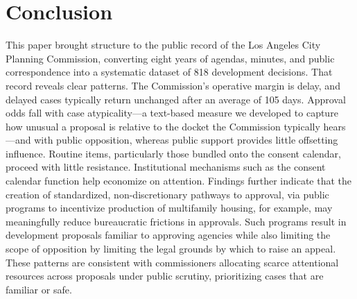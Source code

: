 \section{Conclusion}\label{sec_conclusion}


This paper brought structure to the public record of the Los Angeles City Planning Commission, converting eight years of agendas, minutes, and public correspondence into a systematic dataset of 818 development decisions. That record reveals clear patterns. The Commission's operative margin is delay, and delayed cases typically return unchanged after an average of 105 days. Approval odds fall with case atypicality---a text-based measure we developed to capture how unusual a proposal is relative to the docket the Commission typically hears---and with public opposition, whereas public support provides little offsetting influence. Routine items, particularly those bundled onto the consent calendar, proceed with little resistance. Institutional mechanisms such as the consent calendar function help economize on attention. Findings further indicate that the creation of standardized, non-discretionary pathways to approval, via public programs to incentivize production of multifamily housing, for example, may meaningfully reduce bureaucratic frictions in approvals.  Such programs result in development proposals familiar to approving agencies while also limiting the scope of opposition by limiting the legal grounds by which to raise an appeal. These patterns are consistent with commissioners allocating scarce attentional resources across proposals under public scrutiny, prioritizing cases that are familiar or safe. 


